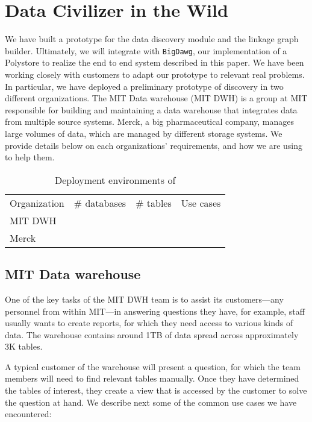 \section{Data Civilizer in the Wild}
\label{sec:wild}

We have built a prototype for the data discovery module and the linkage graph builder.
Ultimately, we will integrate \dcv with \texttt{BigDawg}, our implementation of a Polystore to realize the end to end system described in this paper. 
We have been working closely with customers to adapt our prototype to relevant real problems. 
In particular, we have deployed a preliminary prototype of discovery in two different organizations. 
The MIT Data warehouse (MIT DWH) is a group at MIT responsible for building and maintaining a data warehouse that integrates data from multiple source systems. Merck, a big pharmaceutical company, manages large volumes of data, which are managed by different storage systems. 
We provide details below on each organizations' requirements, and how we are using \dcv to help them.


\begin{table}
\caption{Deployment environments of \dcv{}}\label{tab:dataCivInTheWild}
\begin{tabular}{|l|l|l|l|}
\hline
Organization & \# databases & \# tables & Use cases\\
MIT DWH & & & \\
Merck & & & \\
\hline
\end{tabular}
\end{table}


\subsection{MIT Data warehouse}


One of the key tasks of the MIT DWH team is to assist its customers—any personnel from within MIT—in answering questions they have, for example, staff usually wants to create reports, for which they need access to various kinds of data. The warehouse contains around 1TB of data spread across approximately 3K tables.

A typical customer of the warehouse will present a question, for which the team members will need to find relevant tables manually. Once they have determined the tables of interest, they create a view that is accessed by the customer to solve the question at hand. We describe next some of the common use cases we have encountered:

